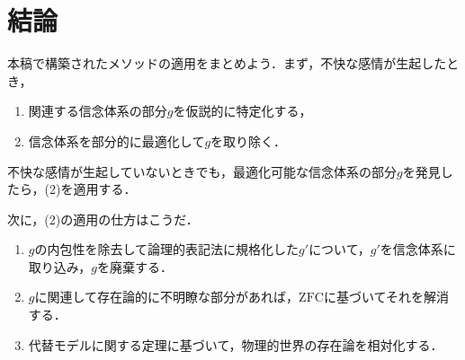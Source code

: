 \section{結論}
\label{sec:結論}

本稿で構築されたメソッドの適用をまとめよう．まず，不快な感情が生起したとき，
\begin{enumerate}[label=(\arabic*)]
    \item 関連する信念体系の部分$g$を仮説的に特定化する，
    \item 信念体系を部分的に最適化して$g$を取り除く．
\end{enumerate}
不快な感情が生起していないときでも，最適化可能な信念体系の部分$g$を発見したら，(2)を適用する．

次に，(2)の適用の仕方はこうだ．
\begin{enumerate}[label=(\alph*)]
    \item $g$の内包性を除去して論理的表記法に規格化した$g'$について，$g'$を信念体系に取り込み，$g$を廃棄する．
    \item $g$に関連して存在論的に不明瞭な部分があれば，$\mathrm{ZFC}$に基づいてそれを解消する．
    \item 代替モデルに関する定理に基づいて，物理的世界の存在論を相対化する．
\end{enumerate}

